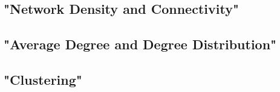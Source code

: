 \subsection{"Network Density and Connectivity"}\label{subsec:"network-density-and-connectivity"}
\subsection{"Average Degree and Degree Distribution"}\label{subsec:"average-degree-and-degree-distribution"}
\subsection{"Clustering"}\label{subsec:"clustering'}